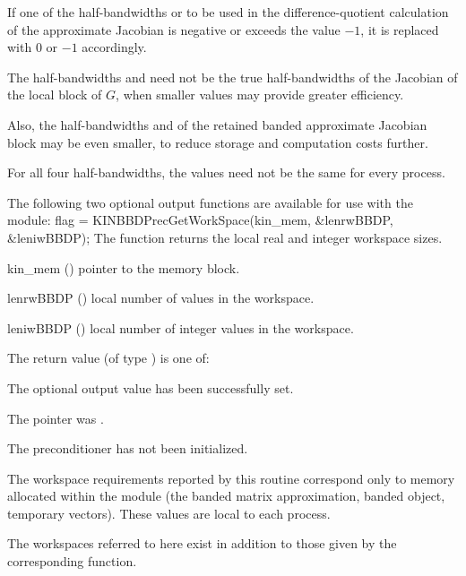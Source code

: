 {
  If one of the half-bandwidths  or  to be used in the
  difference-quotient calculation of the approximate Jacobian is negative
  or exceeds the value $-1$, it is replaced with $0$ or
  $-1$ accordingly.

  The half-bandwidths  and  need
  not be the true half-bandwidths of the Jacobian of the local block of $G$,
  when smaller values may provide greater efficiency.

  Also, the half-bandwidths  and  of the retained
  banded approximate Jacobian block may be even smaller, to reduce
  storage and computation costs further.

  For all four half-bandwidths, the values need not be the same for
  every process.
}
The following two optional output functions are available for use with
the {\kinbbdpre} module:
{
  flag = KINBBDPrecGetWorkSpace(kin\_mem, \&lenrwBBDP, \&leniwBBDP);
}
{
  The function  returns the local
  {\kinbbdpre} real and integer workspace sizes.
}
{
  \begin{args}[lenrwBBDP]
  \item[kin\_mem] ()
    pointer to the {\kinsol} memory block.
  \item[lenrwBBDP] ()
    local number of  values in the {\kinbbdpre} workspace.
  \item[leniwBBDP] ()
    local number of integer values in the {\kinbbdpre} workspace.
  \end{args}
}
{
  The return value  (of type ) is one of:
  \begin{args}
  \item[\id{KINLS\_SUCCESS}]
    The optional output value has been successfully set.
  \item[\id{KINLS\_MEM\_NULL}]
    The  pointer was .
  \item[\Id{KINLS\_PMEM\_NULL}]
    The {\kinbbdpre} preconditioner has not been initialized.
  \end{args}
}
{

  The workspace requirements reported by this routine correspond only
  to memory allocated within the {\kinbbdpre} module (the banded
  matrix approximation, banded {\sunlinsol} object, temporary vectors).
  These values are local to each process.

  The workspaces referred to here exist in addition to those given by the
  corresponding  function.
}
